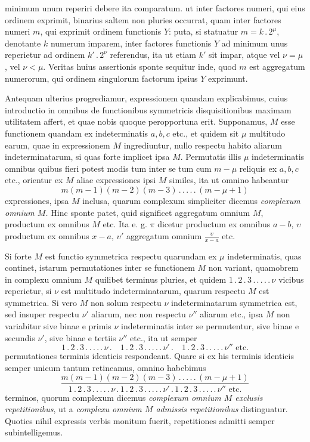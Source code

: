 minimum unum reperiri debere ita comparatum. ut inter factores numeri, qui eius
ordinem exprimit, binarius saltem non pluries occurrat, quam inter factores numeri $m$, qui exprimit ordinem functionis $Y$: puta, si statuatur $m=k\, .\,2^\mu$, denotante $k$ numerum imparem, inter factores functionis $Y$ ad minimum unus reperietur ad ordinem $k'\, .\,2^\nu$ referendus, ita ut etiam $k'$ sit impar, atque vel $\nu=\mu$,
vel $\nu<\mu$. Veritas huius assertionis sponte sequitur inde, quod $m$ est aggregatum numerorum, qui ordinem singulorum factorum ipsius $Y$ exprimunt.

Antequam ulterius progrediamur, expressionem quandam explicabimus, cuius introductio in omnibus de functionibus symmetricis disquisitionibus maximam
utilitatem affert, et quae nobis quoque peropportuna erit. Supponamus, $M$ esse
functionem quandam ex indeterminatis $a,b,c$ etc., et quidem sit $\mu$ multitudo
earum, quae in expressionem $M$ ingrediuntur, nullo respectu habito aliarum indeterminatarum, si quas forte implicet ipsa $M$. Permutatis illis $\mu$ indeterminatis omnibus quibus fieri potest modis tum inter se tum cum $m-\mu$ reliquis ex
$a,b,c$ etc., orientur ex $M$ aliae expressiones ipsi $M$ similes, ita ut omnino habeantur
\[
m(m-1)(m-2)(m-3)\, .\, .\, .\, .\, .\,(m-\mu+1)
\]
expressiones, ipsa $M$ inclusa, quarum complexum simpliciter dicemus \textit{complexum
omnium $M$.} Hinc sponte patet, quid significet aggregatum omnium $M$, productum ex omnibus $M$ etc. Ita e. g. $\pi$ dicetur productum ex omnibus $a-b$,
$\upsilon$ productum ex omnibus $x-a$, $\upsilon'$ aggregatum omnium $\frac{\upsilon}{x-a}$ etc.

Si forte $M$ est functio symmetrica respectu quarundam ex $\mu$ indeterminatis, quas continet, istarum permutationes inter se functionem $M$ non variant, quamobrem in complexu omnium $M$ quilibet terminus pluries, et quidem
$1\, .\,2\, .\,3\, .\, .\, .\, .\, .\,\nu$ vicibus reperietur, si $\nu$ est multitudo indeterminatarum, quarum
respectu $M$ est symmetrica. Si vero $M$ non solum respectu $\nu$ indeterminatarum
symmetrica est, sed insuper respectu $\nu'$ aliarum, nec non respectu $\nu''$ aliarum etc.,
ipsa $M$ non variabitur sive binae e primis $\nu$ indeterminatis inter se permutentur,
sive binae e secundis $\nu'$, sive binae e tertiis $\nu''$ etc., ita ut semper
\[
1\, .\,2\, .\,3\, .\, .\, .\, .\, .\,\nu\, .\quad1\, .\,2\, .\,3\, .\, .\, .\, .\, .\,\nu'\, .\quad1\, .\,2\, .\,3\, .\, .\, .\, .\, .\,\nu''\text{ etc.}
\]
permutationes terminis identicis respondeant. Quare si ex his terminis identicis
semper unicum tantum retineamus, omnino habebimus
\[
\frac{m(m-1)(m-2)(m-3)\, .\, .\, .\, .\, .\,(m-\mu+1)}{1\, .\,2\, .\,3\, .\, .\, .\, .\, .\,\nu\, .\,1\, .\,2\, .\,3\, .\, .\, .\, .\, .\,\nu'\, .\,1\, .\,2\, .\,3\, .\, .\, .\, .\, .\,\nu''\text{ etc.}}
\]
terminos, quorum complexum dicemus \textit{complexum omnium $M$ exclusis repetitionibus}, ut a \textit{complexu omnium $M$ admissis repetitionibus} distinguatur. Quoties nihil
expressis verbis monitum fuerit, repetitiones admitti semper subintelligemus.

